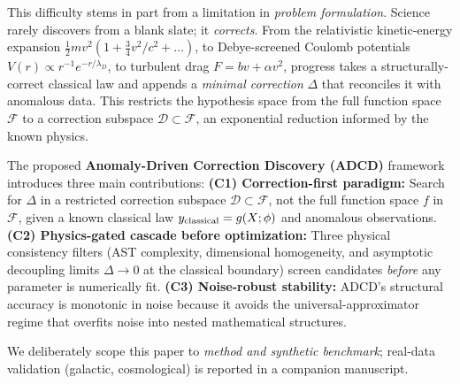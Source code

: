 \documentclass{article}
\begin{document}
This difficulty stems in part from a limitation in \emph{problem formulation}. Science rarely discovers from a blank slate; it \emph{corrects}. From the relativistic kinetic-energy expansion $\tfrac12 mv^2(1+\tfrac34 v^2/c^2+\dots)$, to Debye-screened Coulomb potentials $V(r)\propto r^{-1}e^{-r/\lambda_D}$, to turbulent drag $F=bv+\alpha v^2$, progress takes a structurally-correct classical law and appends a \emph{minimal correction} $\Delta$ that reconciles it with anomalous data. This restricts the hypothesis space from the full function space $\mathcal{F}$ to a correction subspace $\mathcal{D}\subset\mathcal{F}$, an exponential reduction informed by the known physics.

The proposed \textbf{Anomaly-Driven Correction Discovery (ADCD)} framework introduces three main contributions:
\textbf{(C1) Correction-first paradigm:} Search for $\Delta$ in a restricted correction subspace $\mathcal{D} \subset \mathcal{F}$, not the full function space $f$ in $\mathcal{F}$, given a known classical law $y_{\rm classical}=g(X;\phi)$ and anomalous observations.
\textbf{(C2) Physics-gated cascade before optimization:} Three physical consistency filters (AST complexity, dimensional homogeneity, and asymptotic decoupling limits $\Delta \to 0$ at the classical boundary) screen candidates \emph{before} any parameter is numerically fit.
\textbf{(C3) Noise-robust stability:} ADCD's structural accuracy is monotonic in noise because it avoids the universal-approximator regime that overfits noise into nested mathematical structures.

We deliberately scope this paper to \emph{method and synthetic benchmark}; real-data validation (galactic, cosmological) is reported in a companion manuscript.
\end{document}
